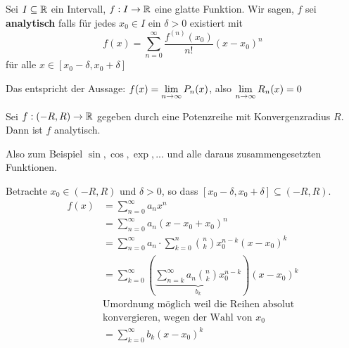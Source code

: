 \documentclass[main.tex]{subfiles}
\begin{document}
\begin{Definition}
  Sei $I \subseteq \mathbb{R}$ ein Intervall, $f:I \to \mathbb{R}$ eine glatte Funktion. Wir sagen, $f$ sei \textbf{analytisch} falls für jedes $x_0\in I$ ein $\delta > 0$ existiert mit
  $$f(x) = \sum \limits_{n=0}^\infty \dfrac{f^{(n)}(x_0)}{n!} (x -x_0)^n$$
  für alle $x \in [x_0 -\delta,x_0 +\delta]$
\end{Definition}

\begin{Bemerkung}
  Das entspricht der Aussage: $f(x) = \lim \limits_{n \to \infty} P_n(x)$, also $\lim \limits_{n \to \infty} R_n(x) = 0$
\end{Bemerkung}

\begin{Bemerkung}
  \begin{Theorem}
    Sei $f : (-R,R) \to \mathbb{R}$ gegeben durch eine Potenzreihe mit Konvergenzradius $R$. Dann ist $f$ analytisch.
  \end{Theorem}
  Also zum Beispiel $\sin, \cos, \exp, ...$ und alle daraus zusammengesetzten Funktionen.
  \begin{Beweis}
    Betrachte $x_0 \in (-R,R)$ und $\delta > 0$, so dass $[x_0 - \delta,x_0+\delta] \subseteq (-R,R)$.
    $$\begin{aligned}
      f(x) &= \sum \limits_{n=0}^\infty a_nx^n\\
      &= \sum \limits_{n=0}^\infty a_n(x-x_0 + x_0)^n\\
      &= \sum \limits_{n=0}^\infty a_n \cdot \sum \limits_{k=0}^n {n \choose k} x_0^{n-k}(x-x_0)^k\\
      &= \sum \limits_{k=0}^\infty\left( \underbrace{\sum \limits_{n=k}^\infty a_n{n \choose k} x_0 ^{n-k}}_{b_k}\right)(x - x_0)^k\\
      & \text{Umordnung möglich weil die Reihen absolut} \\
      & \text{konvergieren, wegen der Wahl von } x_0\\
      &= \sum \limits_{k=0}^\infty b_k (x-x_0)^k
    \end{aligned}$$
  \end{Beweis}
\end{Bemerkung}
\end{document}
